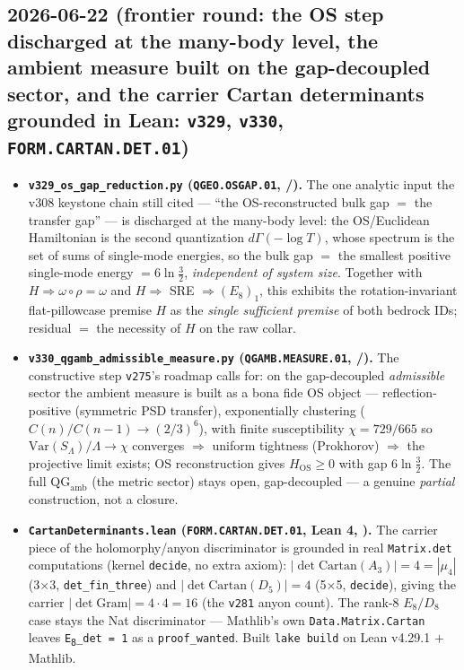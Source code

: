 \subsection*{2026-06-22 (frontier round: the OS step discharged at the many-body level, the ambient measure built on the gap-decoupled sector, and the carrier Cartan determinants grounded in Lean: \texttt{v329}, \texttt{v330}, \texttt{FORM.CARTAN.DET.01})}
\begin{itemize}
\item \textbf{\texttt{v329\_os\_gap\_reduction.py} (\texttt{QGEO.OSGAP.01}, \mE/\mO).} The one analytic input the v308
  keystone chain still cited --- ``the OS-reconstructed bulk gap $=$ the transfer gap'' --- is discharged at the
  many-body level: the OS/Euclidean Hamiltonian is the second quantization $d\Gamma(-\log T)$, whose spectrum is the
  set of sums of single-mode energies, so the bulk gap $=$ the smallest positive single-mode energy $=6\ln\tfrac32$,
  \emph{independent of system size}.  Together with $H\Rightarrow\omega\circ\rho{=}\omega$ and $H\Rightarrow$ SRE
  $\Rightarrow(E_8)_1$, this exhibits the rotation-invariant flat-pillowcase premise $H$ as the \emph{single
  sufficient premise} of both bedrock IDs; residual $=$ the necessity of $H$ on the raw collar.
\item \textbf{\texttt{v330\_qgamb\_admissible\_measure.py} (\texttt{QGAMB.MEASURE.01}, \mE/\mO).} The constructive
  step \texttt{v275}'s roadmap calls for: on the gap-decoupled \emph{admissible} sector the ambient measure is built
  as a bona fide OS object --- reflection-positive (symmetric PSD transfer), exponentially clustering
  ($C(n)/C(n{-}1)\to(2/3)^6$), with finite susceptibility $\chi=729/665$ so $\mathrm{Var}(S_\Lambda)/\Lambda\to\chi$
  converges $\Rightarrow$ uniform tightness (Prokhorov) $\Rightarrow$ the projective limit exists; OS reconstruction
  gives $H_{\mathrm{OS}}\ge0$ with gap $6\ln\tfrac32$.  The full $\mathrm{QG}_{\mathrm{amb}}$ (the metric sector)
  stays open, gap-decoupled --- a genuine \emph{partial} construction, not a closure.
\item \textbf{\texttt{CartanDeterminants.lean} (\texttt{FORM.CARTAN.DET.01}, Lean 4, \mE).} The carrier piece of the
  holomorphy/anyon discriminator is grounded in real \texttt{Matrix.det} computations (kernel \texttt{decide}, no
  extra axiom): $|\det\mathrm{Cartan}(A_3)|{=}4{=}|\mu_4|$ (3$\times$3, \texttt{det\_fin\_three}) and
  $|\det\mathrm{Cartan}(D_5)|{=}4$ (5$\times$5, \texttt{decide}), giving the carrier $|\det\mathrm{Gram}|{=}4\cdot4{=}16$
  (the \texttt{v281} anyon count).  The rank-8 $E_8/D_8$ case stays the Nat discriminator --- Mathlib's own
  \texttt{Data.Matrix.Cartan} leaves \texttt{E\textsubscript{8}\_det = 1} as a \texttt{proof\_wanted}.  Built
  \texttt{lake build} on Lean v4.29.1 $+$ Mathlib.
\end{itemize}

